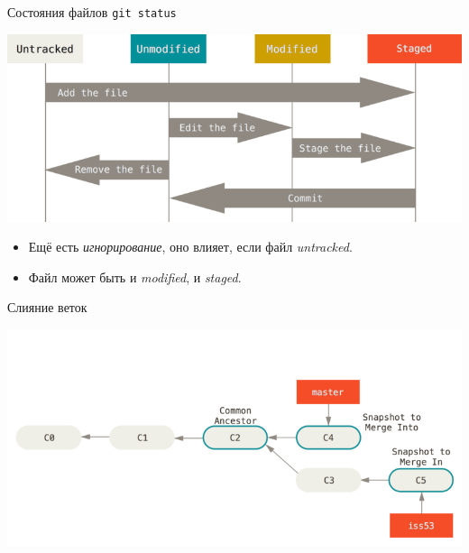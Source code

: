 \begin{frame}{Состояния файлов}
\verb~git status~
\begin{center}
\includegraphics[width=\textwidth,keepaspectratio]{lifecycle.png}
\end{center}
\begin{itemize}
\item Ещё есть \textit{игнорирование}, оно влияет, если файл \textit{untracked}.
\item Файл может быть и \textit{modified}, и \textit{staged}.
\end{itemize}
\end{frame}

\begin{frame}{Слияние веток}
\begin{center}
\includegraphics[width=\textwidth,keepaspectratio]{basic-merging-1.png}
\end{center}
\end{frame}
